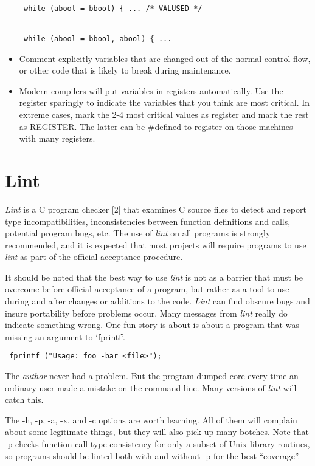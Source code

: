 \begin{itemize}
\begin{verbatim}
 while (abool = bbool) { ... /* VALUSED */ 


 while (abool = bbool, abool) { ... 
\end{verbatim}

\item Comment explicitly variables that are changed out of the normal control
flow, or other code that is likely to break during maintenance. 

\item Modern compilers will put variables in registers automatically. Use the
register sparingly to indicate the variables that you think are most critical.
In extreme cases, mark the 2-4 most critical values as register and mark the
rest as REGISTER. The latter can be \#defined to register on those machines
with many registers.
\end{itemize}
\newpage
\section{Lint}

{\em Lint} is a C program checker [2] that examines C source files to detect and
report type incompatibilities, inconsistencies between function definitions and
calls, potential program bugs, etc. The use of {\em lint} on all programs is
strongly recommended, and it is expected that most projects will require
programs to use {\em lint} as part of the official acceptance procedure. 

It should be noted that the best way to use {\em lint} is not as a barrier that
must be overcome before official acceptance of a program, but rather as a tool
to use during and after changes or additions to the code. {\em Lint} can find
obscure bugs and insure portability before problems occur. Many messages from
{\em lint} really do indicate something wrong. One fun story is about is about
a program that was missing an argument to `fprintf'.
\begin{verbatim}
 fprintf ("Usage: foo -bar <file>"); 
\end{verbatim}
The {\em author} never had a problem. But the program dumped core every time an
ordinary user made a mistake on the command line. Many versions of {\em lint}
will catch this.

The -h, -p, -a, -x, and -c options are worth learning. All of them will
complain about some legitimate things, but they will also pick up many botches.
Note that -p checks function-call type-consistency for only a subset of Unix
library routines, so programs should be linted both with and without -p for the
best ``coverage''.

